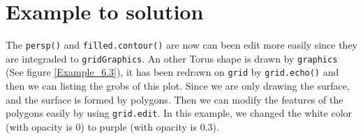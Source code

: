 \documentclass[paper=a4, fontsize=11pt]{report}
\begin{document}
% 
% 
% 
% 

\section{Example to solution}
The \texttt{persp()} and \texttt{filled.contour()} are now can been edit more easily since they are integraded to \texttt{gridGraphics}. An other Torus shape is drawn by \texttt{graphics} (See figure \ref{Example_6.3}), it has been redrawn on \texttt{grid} by \texttt{grid.echo()} and then we can listing the grobs of this plot. Since we are only drawing the surface, and the surface is formed by polygons. Then we can modify the features of the polygons easily by using \texttt{grid.edit}. In this example, we changed the white color (with opacity is 0) to purple (with opacity is 0.3).\\
\end{document}
